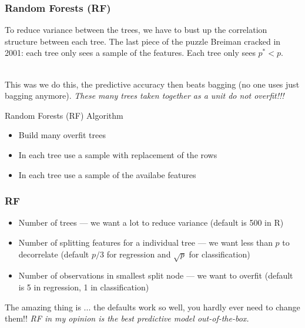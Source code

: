 \documentclass[handout]{beamer}
\begin{document}
\begin{frame}\frametitle{Random Forests (RF)}

To reduce variance between the trees, we have to bust up the correlation structure between each tree. \pause The last piece of the puzzle Breiman cracked in 2001: each tree only sees a sample of the features. \pause Each tree only sees $p^* < p$. \\~\\ \pause

This was we do this, the predictive accuracy then beats bagging (no one uses just bagging anymore). \emph{These many trees taken together as a unit do not overfit!!!}
	
\begin{block}{Random Forests (RF) Algorithm} \pause
\begin{itemize}
\item Build many overfit trees
\item In each tree use a sample with replacement of the rows
\item In each tree use a sample of the availabe features \pause
\end{itemize}
\end{block}


\end{frame}


\begin{frame}\frametitle{RF }


\begin{itemize}
\item Number of trees --- we want a lot to reduce variance (default is 500 in R)
\item Number of splitting features for a individual tree --- we want less than $p$ to decorrelate (default $p/3$ for regression and $\sqrt{p}$ for classification)
\item Number of observations in smallest split node --- we want to overfit (default is 5 in regression, 1 in classification)
\end{itemize}

The amazing thing is ... \pause the defaults work so well, you hardly ever need to change them!! \emph{RF in my opinion is the best predictive model out-of-the-box.}
\end{frame}
\end{document}
